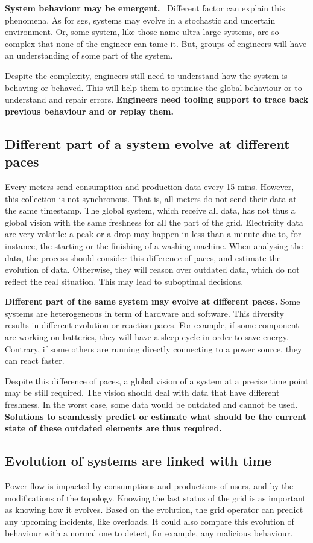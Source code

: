 \textbf{System behaviour may be emergent.}~\cite{zio2011uncertainties}
Different factor can explain this phenomena.
As for \glspl{sg}, systems may evolve in a stochastic and uncertain environment.
Or, some system, like those name ultra-large systems, are so complex that none of the engineer can tame it.
But, groups of engineers will have an understanding of some part of the system.

Despite the complexity, engineers still need to understand how the system is behaving or behaved.
This will help them to optimise the global behaviour or to understand and repair errors.
\textbf{Engineers need tooling support to trace back previous behaviour and or replay them.}


\subsection{Different part of a system evolve at different paces}
Every meters send consumption and production data every 15 mins.
However, this collection is not synchronous.
That is, all meters do not send their data at the same timestamp.
The global system, which receive all data, has not thus a global vision with the same freshness for all the part of the grid.
Electricity data are very volatile: a peak or a drop may happen in less than a minute due to, for instance, the starting or the finishing of a washing machine.
When analysing the data, the process should consider this difference of paces, and estimate the evolution of data.
Otherwise, they will reason over outdated data, which do not reflect the real situation.
This may lead to suboptimal decisions.

\textbf{Different part of the same system may evolve at different paces.}
Some systems are heterogeneous in term of hardware and software.
This diversity results in different evolution or reaction paces.
For example, if some component are working on batteries, they will have a sleep cycle in order to save energy.
Contrary, if some others are running directly connecting to a power source, they can react faster.

Despite this difference of paces, a global vision of a system at a precise time point may be still required.
The vision should deal with data that have different freshness.
In the worst case, some data would be outdated and cannot be used.
\textbf{Solutions to seamlessly predict or estimate what should be the current state of these outdated elements are thus required.}


\subsection{Evolution of systems are linked with time}
Power flow is impacted by consumptions and productions of users, and by the modifications of the topology.
Knowing the last status of the grid is as important as knowing how it evolves.
Based on the evolution, the grid operator can predict any upcoming incidents, like overloads.
It could also compare this evolution of behaviour with a normal one to detect, for example, any malicious behaviour.

